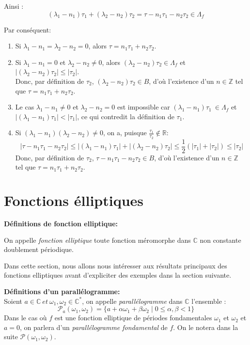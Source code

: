 \documentclass{article}
\begin{document}
Ainsi :
\[
(\lambda_1 - n_1)\tau_1 + (\lambda_2 - n_2)\tau_2 = \tau - n_1\tau_1 - n_2\tau_2 \in \Lambda_f
\]

Par conséquent:
\begin{enumerate}
    \item Si \(\lambda_1 - n_1 = \lambda_2 - n_2 = 0\), alors \(\tau = n_1\tau_1 + n_2\tau_2\).
    \item Si \(\lambda_1 - n_1 = 0\) et \(\lambda_2 - n_2 \neq 0\), alors \((\lambda_2 - n_2)\tau_2 \in \Lambda_f\) et \(\left|(\lambda_2 - n_2)\tau_2\right| \leq |\tau_2|\).\\
    Donc, par définition de \(\tau_2\), \((\lambda_2 - n_2)\tau_2 \in B\), d'où l'existence d'un \(n \in \mathbb{Z}\) tel que \(\tau = n_1\tau_1 + n_2\tau_2\).
    \item Le cas \(\lambda_1 - n_1 \neq 0\) et \(\lambda_2 - n_2 = 0\) est impossible car \((\lambda_1 - n_1)\tau_1\ \in \Lambda_f\) et \(\left|(\lambda_1 - n_1)\tau_1\right| < |\tau_1|\), ce qui contredit la définition de \(\tau_1\).
    \item Si \((\lambda_1 - n_1)(\lambda_2 - n_2) \neq 0\), on a, puisque \(\frac{\tau_1}{\tau_2} \notin \mathbb{R}\):
    \[
    \left|\tau - n_1\tau_1 - n_2\tau_2\right| \leq \left|(\lambda_1 - n_1)\tau_1\right| + \left|(\lambda_2 - n_2)\tau_2\right| \leq \frac{1}{2}\left(|\tau_1| + |\tau_2|\right) \leq |\tau_2|
    \]
    Donc, par définition de \(\tau_2\), \(\tau -n_1\tau_1 - n_2\tau_2 \in B\), d'où l'existence d'un \(n \in \mathbb{Z}\) tel que \(\tau = n_1\tau_1 + n_2\tau_2\).
\end{enumerate}



\section{Fonctions élliptiques}
\textbf{Définitions de fonction elliptique: \\}


On appelle \textit{fonction elliptique} toute fonction méromorphe dans $\mathbb{C}$ non constante doublement périodique.


Dans cette section, nous allons nous intéresser aux résultats principaux des fonctions elliptiques avant d'expliciter des exemples dans la section suivante.


\textbf{Définitions d'un parallélogramme: \\}
Soient $ a \in \mathbb{C}  \ et \  \omega_1, \omega_2 \in \mathbb{C}^{*}$, on appelle \textit{parallélogramme} dans $\mathbb{C}$ l'ensemble :
\[
\mathcal{P}_{a}{(\omega_1, \omega_2)} = \{ a + \alpha \omega_1 + \beta \omega_2 \mid 0 \leq \alpha, \beta < 1 \}
\]
Dans le cas où $f$ est une fonction elliptique de périodes fondamentales $\omega_1$ et $\omega_2$ et $a=0$, on parlera d'un \textit{parallélogramme fondamental} de $f$. On le notera dans la suite $\mathcal{P}{(\omega_1, \omega_2)}$.
\end{document}
